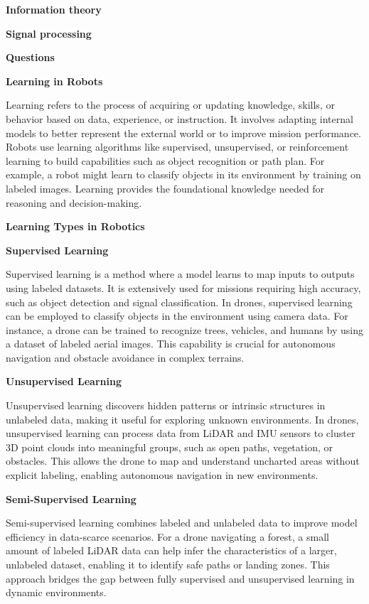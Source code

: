 \documentclass{book}
\providecommand{\ProjectDeepHeading}[2]{%
    \par\medskip\noindent\textbf{#2}\par\smallskip
}
\begin{document}
        
        \ProjectDeepHeading{4}{Information theory}
        
        
        \ProjectDeepHeading{4}{Signal processing}
        
        
        \ProjectDeepHeading{4}{Questions}


\ProjectDeepHeading{2}{Learning in Robots}
Learning refers to the process of acquiring or updating knowledge, skills, or behavior based on data, experience, or instruction. It involves adapting internal models to better represent the external world or to improve mission performance. Robots use learning algorithms like supervised, unsupervised, or reinforcement learning to build capabilities such as object recognition or path plan. For example, a robot might learn to classify objects in its environment by training on labeled images. Learning provides the foundational knowledge needed for reasoning and decision-making.

\ProjectDeepHeading{3}{Learning Types in Robotics}

\ProjectDeepHeading{4}{Supervised Learning}
Supervised learning is a method where a model learns to map inputs to outputs using labeled datasets. It is extensively used for missions requiring high accuracy, such as object detection and signal classification. In drones, supervised learning can be employed to classify objects in the environment using camera data. For instance, a drone can be trained to recognize trees, vehicles, and humans by using a dataset of labeled aerial images. This capability is crucial for autonomous navigation and obstacle avoidance in complex terrains.

\ProjectDeepHeading{4}{Unsupervised Learning}
Unsupervised learning discovers hidden patterns or intrinsic structures in unlabeled data, making it useful for exploring unknown environments. In drones, unsupervised learning can process data from LiDAR and IMU sensors to cluster 3D point clouds into meaningful groups, such as open paths, vegetation, or obstacles. This allows the drone to map and understand uncharted areas without explicit labeling, enabling autonomous navigation in new environments. 

\ProjectDeepHeading{4}{Semi-Supervised Learning}
Semi-supervised learning combines labeled and unlabeled data to improve model efficiency in data-scarce scenarios. For a drone navigating a forest, a small amount of labeled LiDAR data can help infer the characteristics of a larger, unlabeled dataset, enabling it to identify safe paths or landing zones. This approach bridges the gap between fully supervised and unsupervised learning in dynamic environments. 
\end{document}

